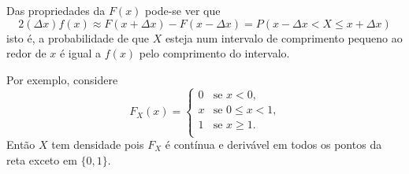 %
\begin{frame}
\bigskip
Das propriedades da $F(x)$ pode-se ver que
\begin{equation*}
2(\Delta x)f(x)\approx F(x+\Delta x)-F(x-\Delta x)=P(x-\Delta
x<X\leq x+\Delta x)
\end{equation*} isto é, a probabilidade de que $X$ esteja  num intervalo de comprimento pequeno ao redor de $x$ é igual a $f(x)$ pelo comprimento do intervalo.
\begin{exem}
Por exemplo, considere
%
\[
F_X(x)= \left\{
\begin{array}{ll}
0 & \mbox{se \ $x< 0$,} \\
x & \mbox{se \ $0\leq x< 1$,} \\
1 & \mbox{se \ $x\geq 1$.}\\
\end{array}
\right.
\]
%
Então $X$ tem densidade pois $F_X$ é contínua e derivável em todos
os pontos da reta exceto em $\{0,1\}$.
\end{exem}
\end{frame}


